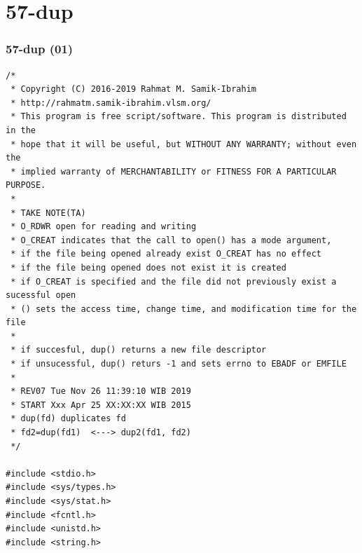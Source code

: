 \documentclass[aspectratio=169, xcolor=table, notheorems, hyperref={pdfpagelabels=false}]{beamer}
\begin{document}
\section{57-dup}
\begin{frame}[fragile]
\frametitle{57-dup (01)}
\begin{lstlisting}[basicstyle=\ttfamily\tiny]
/*
 * Copyright (C) 2016-2019 Rahmat M. Samik-Ibrahim
 * http://rahmatm.samik-ibrahim.vlsm.org/
 * This program is free script/software. This program is distributed in the 
 * hope that it will be useful, but WITHOUT ANY WARRANTY; without even the 
 * implied warranty of MERCHANTABILITY or FITNESS FOR A PARTICULAR PURPOSE.
 *
 * TAKE NOTE(TA)
 * O_RDWR open for reading and writing
 * O_CREAT indicates that the call to open() has a mode argument,
 * if the file being opened already exist O_CREAT has no effect
 * if the file being opened does not exist it is created
 * if O_CREAT is specified and the file did not previously exist a sucessful open
 * () sets the access time, change time, and modification time for the file
 *
 * if succesful, dup() returns a new file descriptor
 * if unsucessful, dup() returs -1 and sets errno to EBADF or EMFILE
 * 
 * REV07 Tue Nov 26 11:39:10 WIB 2019
 * START Xxx Apr 25 XX:XX:XX WIB 2015
 * dup(fd) duplicates fd
 * fd2=dup(fd1)  <---> dup2(fd1, fd2)
 */

#include <stdio.h>
#include <sys/types.h>
#include <sys/stat.h>
#include <fcntl.h>
#include <unistd.h>
#include <string.h>

\end{lstlisting}
\end{frame}
\end{document}
